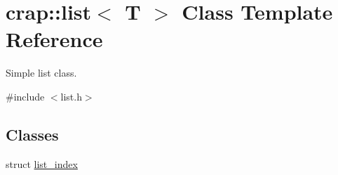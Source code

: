 \hypertarget{classcrap_1_1list}{}\section{crap\+:\+:list$<$ T $>$ Class Template Reference}
\label{classcrap_1_1list}


Simple list class.  




{\ttfamily \#include $<$list.\+h$>$}

\subsection*{Classes}
\begin{DoxyCompactItemize}
\item 
struct \hyperlink{structcrap_1_1list_1_1list__index}{list\+\_\+index}
\end{DoxyCompactItemize}

